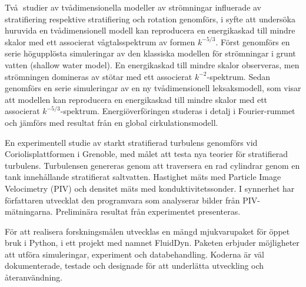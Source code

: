 \noindent%
Tv\aa $ \; $  studier av tv\aa dimensionella modeller av str\"omningar
influerade av stratifiering respektive stratifiering och rotation genomf\"ors,
i syfte att unders\"oka huruvida en {tv\aa}dimensionell modell kan reproducera en energikaskad till mindre skalor med ett associerat v\aa gtalsspektrum av formen $ k^{-5/3} $.  F\"orst genomf\"ors en serie h\"oguppl\"osta simuleringar av den klassiska modellen f\"or str\"omningar i grunt vatten (shallow water model). En energikaskad till mindre skalor observeras, men str\"omningen domineras av st\"otar med ett associerat $ k^{-2} $-spektrum.
Sedan genomf\"ors en serie simuleringar av en ny tv\aa dimensionell leksaksmodell, som visar att modellen kan reproducera en energikaskad till mindre skalor med ett associerat $ k^{-5/3}$-spektrum. Energi\"overf\"oringen studeras i detalj i Fourier-rummet och j\"amf\"ors med resultat fr\aa n en global cirkulationsmodell.


En experimentell studie av starkt stratifierad turbulens genomf\"ors vid Coriolisplattformen i Grenoble, med m\aa let att testa nya teorier f\"or stratifierad turbulens. Turbulensen genereras genom att traversera en rad cylindrar genom en tank inneh\aa llande stratifierat saltvatten. Hastighet m\"ats med Particle Image Velocimetry (PIV) och densitet m\"ats med konduktivitetssonder. I synnerhet har f\"orfattaren utvecklat den programvara som analyserar bilder fr\aa n PIV-m\"atningarna. Prelimin\"ara resultat fr\aa n experimentet presenteras.

F\"or att realisera forskningsm\aa len  utvecklas en m\"angd mjukvarupaket f\"or \"oppet bruk i Python, i ett projekt med namnet FluidDyn. Paketen erbjuder m\"ojligheter att utf\"ora simuleringar, experiment och databehandling. Koderna \"ar v\"al dokumenterade, testade och designade f\"or att underl\"atta utveckling och \aa teranv\"andning.

